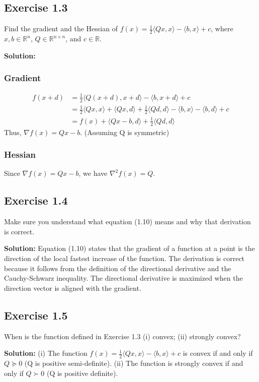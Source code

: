\documentclass{article}
\begin{document}
\subsection*{Exercise 1.3}
Find the gradient and the Hessian of $f(x) = \frac{1}{2} \langle Qx, x \rangle - \langle b, x \rangle + c$, where $x, b \in \mathbb{R}^n$, $Q \in \mathbb{R}^{n \times n}$, and $c \in \mathbb{R}$.

\textbf{Solution:}
\subsubsection*{Gradient}
\begin{align*}
f(x + d) &= \frac{1}{2} \langle Q(x + d), x + d \rangle - \langle b, x + d \rangle + c \\
&= \frac{1}{2} \langle Qx, x \rangle + \langle Qx, d \rangle + \frac{1}{2} \langle Qd, d \rangle - \langle b, x \rangle - \langle b, d \rangle + c \\
&= f(x) + \langle Qx - b, d \rangle + \frac{1}{2} \langle Qd, d \rangle
\end{align*}
Thus, $\nabla f(x) = Qx - b$. (Assuming Q is symmetric)

\subsubsection*{Hessian}
Since $\nabla f(x) = Qx - b$, we have $\nabla^2 f(x) = Q$.

\subsection*{Exercise 1.4}
Make sure you understand what equation (1.10) means and why that derivation is correct.

\textbf{Solution:}
Equation (1.10) states that the gradient of a function at a point is the direction of the local fastest increase of the function. The derivation is correct because it follows from the definition of the directional derivative and the Cauchy-Schwarz inequality. The directional derivative is maximized when the direction vector is aligned with the gradient.

\subsection*{Exercise 1.5}
When is the function defined in Exercise 1.3 (i) convex; (ii) strongly convex?

\textbf{Solution:}
(i) The function $f(x) = \frac{1}{2} \langle Qx, x \rangle - \langle b, x \rangle + c$ is convex if and only if $Q \succeq 0$ (Q is positive semi-definite).
(ii) The function is strongly convex if and only if $Q \succ 0$ (Q is positive definite).
\end{document}
